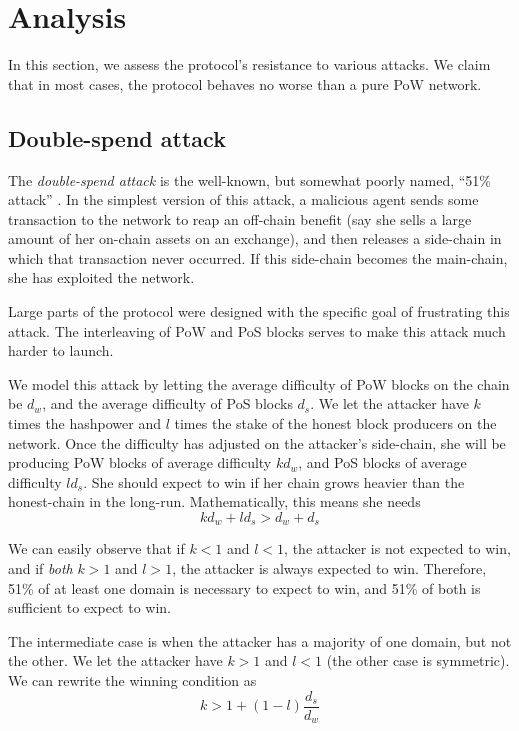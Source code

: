 \section{Analysis}
\label{analysis}

In this section, we assess the protocol's resistance to various attacks. We claim that in most cases, the protocol behaves no worse than a pure PoW network. 

\subsection{Double-spend attack}
\label{double_spend_attack}

The \textit{double-spend attack} is the well-known, but somewhat poorly named, ``51\% attack'' \cite{selfish_mining}. In the simplest version of this attack, a malicious agent sends some transaction to the network to reap an off-chain benefit (say she sells a large amount of her on-chain assets on an exchange), and then releases a side-chain in which that transaction never occurred. If this side-chain becomes the main-chain, she has 
exploited the network.

Large parts of the protocol were designed with the specific goal of frustrating this attack. The interleaving of PoW and PoS blocks serves to make this attack much harder to launch.

We model this attack by letting the average difficulty of PoW blocks on the chain be $d_w$, and the average difficulty of PoS blocks $d_s$. We let the attacker have $k$ times the hashpower and $l$ times the stake of the honest block producers on the network. Once the difficulty has adjusted on the attacker's side-chain, she will be producing PoW blocks of average difficulty $kd_w$, and PoS blocks of average difficulty $ld_s$. She should expect to win if her chain grows heavier 
than the honest-chain in the long-run. Mathematically, this means she needs $$kd_w + ld_s > d_w + d_s$$

We can easily observe that if $k < 1$ and $l < 1$, the attacker is not expected to win, and if \textit {both} $k>1$ and $l>1$, the attacker is always expected to win. Therefore, 51\% of at least one
domain is necessary to expect to win, and 51\% of both is sufficient to expect to win. 

The intermediate case is when the attacker has a majority of one domain, but not the other. We let the attacker have $k>1$ and $l<1$ (the other case is symmetric). We can rewrite the winning condition as 
$$k > 1 + (1-l)\frac{d_s}{d_w}$$

